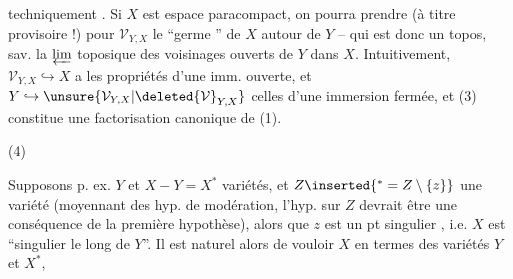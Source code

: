 
techniquement . Si $X$ est   espace paracompact, on pourra prendre (à titre provisoire !) pour $\mathcal V_{Y,X}$ le ``germe '' de $X$ autour de $Y$ -- qui est donc un topos, sav. la $\varprojlim$ toposique des voisinages ouverts de $Y$ dans $X$. Intuitivement, $\mathcal V_{Y,X}\hookrightarrow X$ a les propriétés d'une imm. ouverte, et $Y\hookrightarrow\unsure{\mathcal V_{Y,X}|\deleted{\mathcal V}_{Y,X}}$ celles d'une immersion fermée, et (3) constitue une factorisation canonique de (1).



(4)

Supposons p. ex. $Y$ et $X-Y=X^*$  variétés, et $Z\inserted{{}^*=Z\setminus\{z\}}$ une variété (moyennant des hyp. de modération, l'hyp. sur $Z$ devrait être une conséquence de la première hypothèse),  alors que $z$ est un pt singulier , i.e. $X$ est ``singulier le long de $Y$''. Il est naturel alors de vouloir  $X$ en termes des variétés $Y$ et $X^*$,

